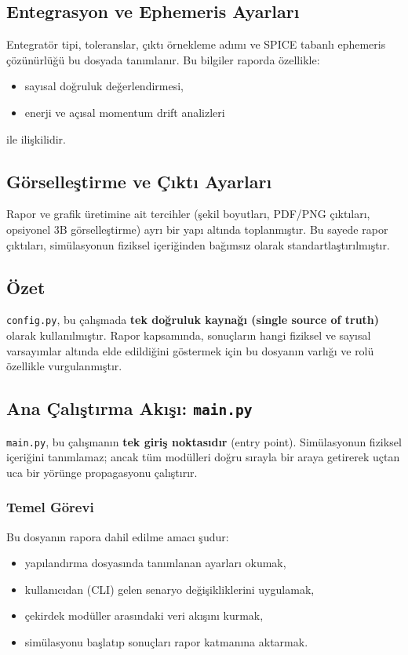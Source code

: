 \subsection*{Entegrasyon ve Ephemeris Ayarları}
Entegratör tipi, toleranslar, çıktı örnekleme adımı
ve SPICE tabanlı ephemeris çözünürlüğü
bu dosyada tanımlanır.
Bu bilgiler raporda özellikle:
\begin{itemize}
  \item sayısal doğruluk değerlendirmesi,
  \item enerji ve açısal momentum drift analizleri
\end{itemize}
ile ilişkilidir.

\subsection*{Görselleştirme ve Çıktı Ayarları}
Rapor ve grafik üretimine ait tercihler
(şekil boyutları, PDF/PNG çıktıları,
opsiyonel 3B görselleştirme)
ayrı bir yapı altında toplanmıştır.
Bu sayede rapor çıktıları,
simülasyonun fiziksel içeriğinden bağımsız olarak
standartlaştırılmıştır.

\subsection*{Özet}
\texttt{config.py}, bu çalışmada
\textbf{tek doğruluk kaynağı (single source of truth)}
olarak kullanılmıştır.
Rapor kapsamında,
sonuçların hangi fiziksel ve sayısal varsayımlar altında elde edildiğini
göstermek için bu dosyanın varlığı ve rolü özellikle vurgulanmıştır.


\newpage
\subsection{Ana Çalıştırma Akışı: \texttt{main.py}}
\label{subsec:main_py}

\texttt{main.py}, bu çalışmanın \textbf{tek giriş noktasıdır} (entry point).
Simülasyonun fiziksel içeriğini tanımlamaz;
ancak tüm modülleri doğru sırayla bir araya getirerek
uçtan uca bir yörünge propagasyonu çalıştırır.

\subsubsection{Temel Görevi}
Bu dosyanın rapora dahil edilme amacı şudur:
\begin{itemize}
  \item yapılandırma dosyasında tanımlanan ayarları okumak,
  \item kullanıcıdan (CLI) gelen senaryo değişikliklerini uygulamak,
  \item çekirdek modüller arasındaki veri akışını kurmak,
  \item simülasyonu başlatıp sonuçları rapor katmanına aktarmak.
\end{itemize}

